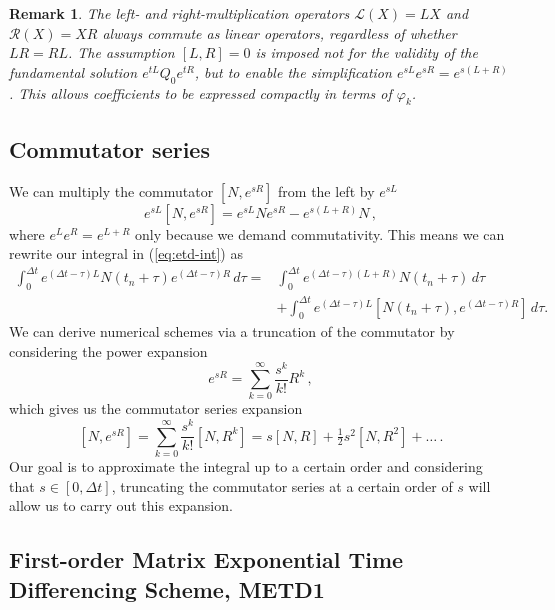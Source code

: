 \documentclass[12pt]{article}
\newtheorem{rmk}{Remark}
\begin{document}
\begin{rmk}
The left- and right-multiplication operators $\mathcal{L}(X) = LX$ and $\mathcal{R}(X) = XR$ always commute as linear operators, regardless of whether $LR = RL$. The assumption $[L,R] = 0$ is imposed not for the validity of the fundamental solution $e^{tL}Q_0 e^{tR}$, but to enable the simplification $e^{sL}e^{sR} = e^{s(L+R)}$. This allows coefficients to be expressed compactly in terms of $\varphi_k$.
\end{rmk}

\subsection{Commutator series}
We can multiply the commutator $[N,e^{sR}] $ from the left by $e^{sL}$
\begin{equation*}
    e^{sL}[N,e^{sR}] = e^{sL}Ne^{sR} - e^{s(L+R)}N\,,
\end{equation*}
where $e^L e^R = e^{L+R}$ only because we demand commutativity. This means we can rewrite our integral in (\ref{eq:etd-int}) as
\begin{align}
 \label{eq:integ}
    \int_0^{\Delta t} e^{(\Delta t-\tau)L} N(t_n+\tau) e^{(\Delta t-\tau)R}\,d\tau  \nonumber =  &\int_0^{\Delta t} e^{(\Delta t-\tau)(L+R)} N(t_n+\tau)\,d\tau \nonumber  \,  \\ &+ \int_0^{\Delta t} e^{(\Delta t-\tau)L} [N(t_n+\tau),e^{(\Delta t-\tau)R}]\,d\tau.
\end{align}
We can derive numerical schemes via a truncation of the commutator by considering the power expansion
\begin{equation*}
  e^{sR} = \sum_{k=0}^\infty \frac{s^k}{k!}R^k\,,
\end{equation*}
which gives us the commutator series expansion 
\begin{equation*}
  \label{eq:commutator-series}
  [N, e^{sR}] = \sum_{k=0}^\infty \frac{s^k}{k!} [N,R^k] = s[N,R] + \tfrac12 s^2 [N,R^2] + \dots \, .
\end{equation*}
Our goal is to approximate the integral up to a certain order and considering that $s \in [0,\Delta t]$, truncating the commutator series at a certain order of $s$ will allow us to 
carry out this expansion.

\subsection{First-order Matrix Exponential Time Differencing Scheme, METD1}
\end{document}
